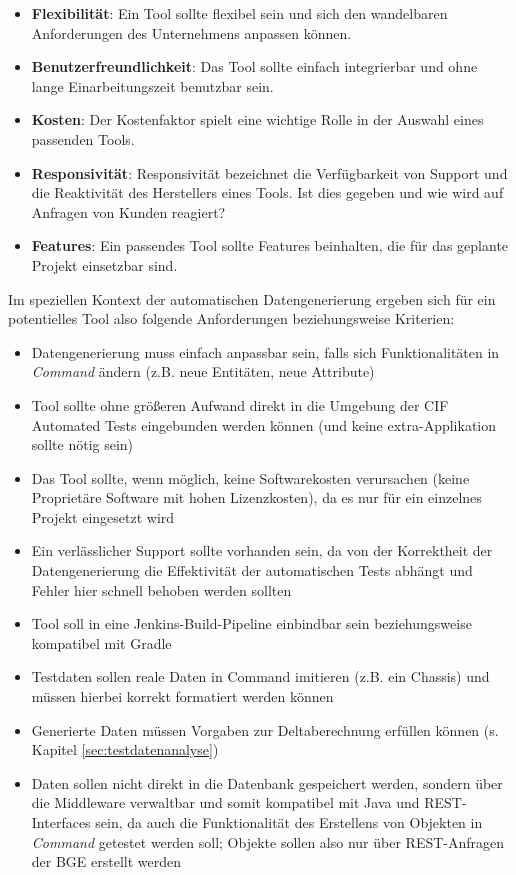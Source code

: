 \begin{itemize}
    \item \textbf{Flexibilität}: Ein Tool sollte flexibel sein und sich den wandelbaren Anforderungen des Unternehmens anpassen können.
    \item \textbf{Benutzerfreundlichkeit}: Das Tool sollte einfach integrierbar und ohne lange Einarbeitungszeit benutzbar sein.
    \item \textbf{Kosten}: Der Kostenfaktor spielt eine wichtige Rolle in der Auswahl eines passenden Tools.
    \item \textbf{Responsivität}: Responsivität bezeichnet die Verfügbarkeit von Support und die Reaktivität des Herstellers eines Tools. Ist dies gegeben und wie wird auf Anfragen von Kunden reagiert?
    \item \textbf{Features}: Ein passendes Tool sollte Features beinhalten, die für das geplante Projekt einsetzbar sind.
\end{itemize}
\cite{taheri:2015}

Im speziellen Kontext der automatischen Datengenerierung ergeben sich für ein potentielles Tool also folgende Anforderungen beziehungsweise Kriterien:

\begin{itemize}
    \item Datengenerierung muss einfach anpassbar sein, falls sich Funktionalitäten in \textit{Command} ändern (z.B. neue Entitäten, neue Attribute)
    \item Tool sollte ohne größeren Aufwand direkt in die Umgebung der \ac{CIF} Automated Tests eingebunden werden können (und keine extra-Applikation sollte nötig sein)
    \item Das Tool sollte, wenn möglich, keine Softwarekosten verursachen (keine Proprietäre Software mit hohen Lizenzkosten), da es nur für ein einzelnes Projekt eingesetzt wird
    \item Ein verlässlicher Support sollte vorhanden sein, da von der Korrektheit der Datengenerierung die Effektivität der automatischen Tests abhängt und Fehler hier schnell behoben werden sollten
    \item Tool soll in eine Jenkins-Build-Pipeline einbindbar sein beziehungsweise kompatibel mit Gradle
    \item Testdaten sollen reale Daten in Command imitieren (z.B. ein Chassis) und müssen hierbei korrekt formatiert werden können
    \item Generierte Daten müssen Vorgaben zur Deltaberechnung erfüllen können (s. Kapitel \ref{sec:testdatenanalyse})
    \item Daten sollen nicht direkt in die Datenbank gespeichert werden, sondern über die Middleware verwaltbar und somit kompatibel mit Java und \ac{REST}-Interfaces sein, da auch die Funktionalität des Erstellens von Objekten in \textit{Command} getestet werden soll; Objekte sollen also nur über \ac{REST}-Anfragen der \ac{BGE} erstellt werden
\end{itemize}

